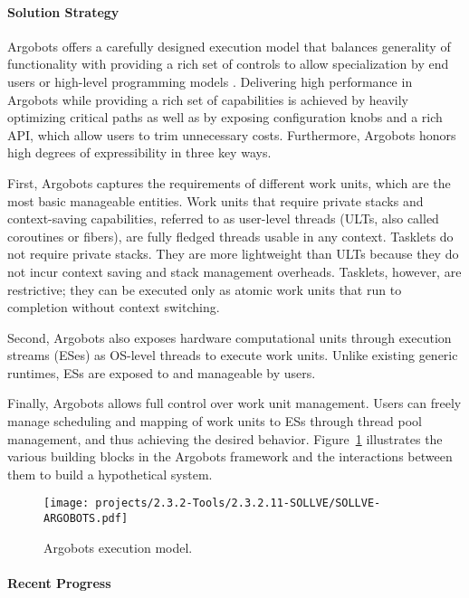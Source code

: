 \paragraph{Solution Strategy}
Argobots offers a carefully designed execution model that balances
generality of functionality with providing a rich set of controls to
allow specialization by end users or high-level programming models
\cite{seo2018}.  Delivering high performance in Argobots while
providing a rich set of capabilities is achieved by heavily optimizing
critical paths as well as by exposing configuration knobs and a rich
API, which allow users to trim unnecessary costs. Furthermore,
Argobots honors high degrees of expressibility in 
three key ways.


First, Argobots captures the requirements of different work units, which
are the most basic manageable entities. Work units that require
private stacks and context-saving capabilities, referred to as
user-level threads (ULTs, also called coroutines or
fibers), are fully fledged threads usable in any context.
Tasklets do not require private stacks. They are more
lightweight than ULTs because they do not incur context saving and
stack management overheads.  Tasklets, however, are restrictive; they
can be executed only as atomic work units that run to completion
without context switching.

Second, Argobots also exposes hardware computational units through execution
streams (ESes) as OS-level threads to execute work units. Unlike
existing generic runtimes, ESs are exposed to and manageable by users.

Finally, Argobots allows full control over work unit management.  Users
can freely manage scheduling and mapping of work units to ESs
through thread pool management, and thus achieving the desired
behavior. Figure~\ref{fig:sollve-argobots} illustrates the various
building blocks in the Argobots framework and the interactions between
them to build a hypothetical system.


\begin{figure}[htb]
  \centering
  \texttt{[image: projects/2.3.2-Tools/2.3.2.11-SOLLVE/SOLLVE-ARGOBOTS.pdf]}
  \caption{\label{fig:sollve-argobots}Argobots execution model.}
\end{figure}

\paragraph{Recent Progress}

